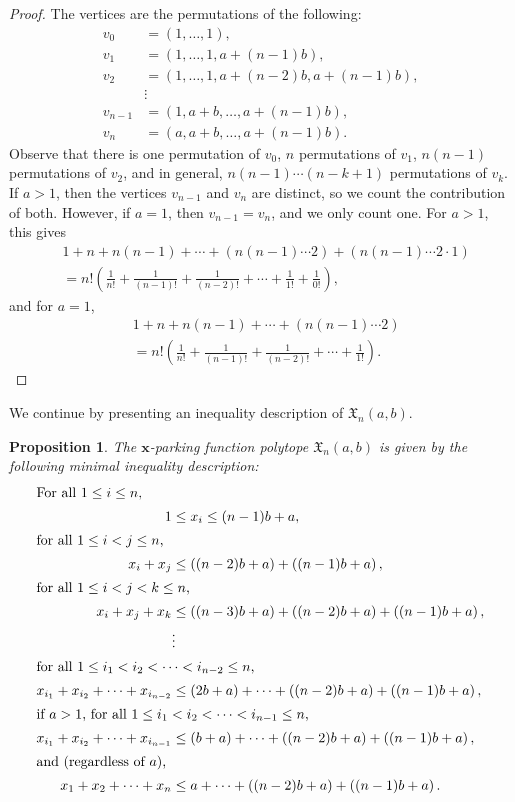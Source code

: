 \documentclass[11pt]{amsart}
\newtheorem{proposition}[theorem]{Proposition}
\theoremstyle{definition}
\newcommand{\0}{\emptyset}
\newcommand{\bx}{\mathbf{x}}
\newcommand{\Xn}{\mathfrak{X}_{n}(a,b)}
\begin{document}
\begin{proof}
The vertices are the permutations of the following: 
\begin{align*}
    v_0 &= (1,\ldots,1),\\
    v_1 &= (1,\ldots,1, a+(n-1)b),\\
    v_2 &= (1,\ldots,1, a+(n-2)b, a+(n-1)b),\\
    &\vdots\\
    v_{n-1} &= (1,a+b,\ldots, a+(n-1)b),\\
    v_{n} &= (a,a+b,\ldots, a+(n-1)b).
\end{align*}
Observe that there is one permutation of $v_0$, $n$ permutations of $v_1$, $n(n-1)$ permutations of $v_2$, and in general, $n(n-1)\cdots(n-k+1)$ permutations of $v_k$. 
If $a>1$, then the vertices $v_{n-1}$ and $v_n$ are distinct, so we count the contribution of both. 
However, if $a=1$, then $v_{n-1}=v_n$, and we only count one. 
For $a>1$, this gives
\begin{align*}
    &1 + n+ n(n-1) + \cdots + \left(n(n-1)\cdots 2\right) + \left(n(n-1)\cdots 2\cdot1\right)\\ &= n!\left(\frac{1}{n!} + \frac{1}{(n-1)!} + \frac{1}{(n-2)!} + \cdots + \frac{1}{1!} + \frac{1}{0!}\right),
\end{align*} 
and for $a=1$,
\begin{align*}
    &1 + n+ n(n-1) + \cdots + \left(n(n-1)\cdots 2\right)\\ &= n!\left(\frac{1}{n!} + \frac{1}{(n-1)!} + \frac{1}{(n-2)!} + \cdots + \frac{1}{1!}\right).
\end{align*}
\end{proof}

We continue by presenting an inequality description of $\Xn$.
\begin{proposition}\label{prop:inequality}
The $\bx$-parking function polytope $\Xn$ is given by the following minimal inequality description:
\begin{align*}
\intertext{\emph{For all} $1 \leq i \leq n$,}
    1 &\leq x_i \leq (n-1)b+a,  \\
\intertext{\emph{for all} $1 \leq i < j \leq n$,}    
    x_i+x_j &\leq \left((n-2)b+a\right) + \left( (n-1)b+a\right),\\
\intertext{\emph{for all} $1 \leq i < j < k \leq n$,}    
    x_i+x_j+x_k &\leq \left((n-3)b+a\right) + \left((n-2)b+a\right) + \left( (n-1)b+a\right),\\
    &\vdots\\
\intertext{\emph{for all} $1 \leq i_1 < i_2 < \cdots < i_{n-2} \leq n$,}     
    x_{i_1}+ x_{i_2}+ \cdots + x_{i_{n-2}} &\leq (2b+a) + \cdots + \left( (n-2)b+a\right) + \left((n-1)b+a\right),\\
\intertext{\emph{if $a > 1$, for all} $1 \leq i_1 < i_2 < \cdots < i_{n-1} \leq n$,}
    x_{i_1}+ x_{i_2}+ \cdots + x_{i_{n-1}} &\leq (b+a) + \cdots + \left( (n-2)b+a\right) + \left((n-1)b+a\right),\\
\intertext{\emph{and (regardless of $a$),}}    
    x_{1}+ x_{2}+ \cdots + x_{n} &\leq a + \cdots + \left( (n-2)b+a\right) + \left((n-1)b+a\right).
\end{align*}
\end{proposition}
\end{document}
